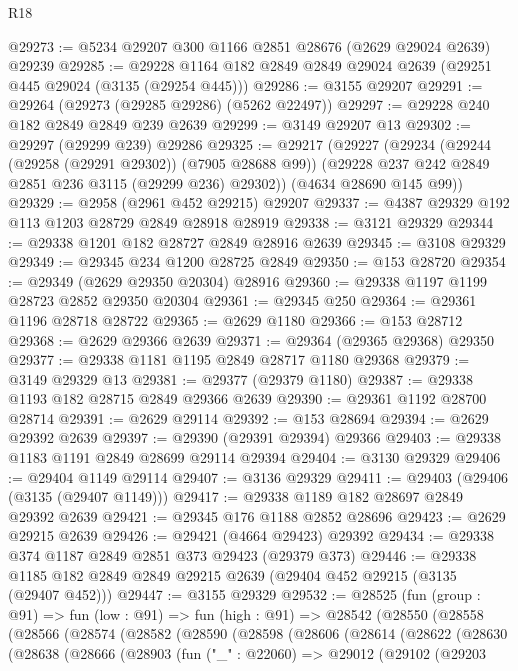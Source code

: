 \begin{lexlean}{R18}
\begin{coremodule}
@29273 := @5234 @29207 @300 @1166 @2851 @28676 (@2629 @29024 @2639) @29239
@29285 := @29228 @1164 @182 @2849 @2849 @29024 @2639 (@29251 @445 @29024 (@3135 (@29254 @445)))
@29286 := @3155 @29207
@29291 := @29264 (@29273 (@29285 @29286) (@5262 @22497))
@29297 := @29228 @240 @182 @2849 @2849 @239 @2639
@29299 := @3149 @29207 @13
@29302 := @29297 (@29299 @239) @29286
@29325 := @29217
    (@29227
      (@29234
        (@29244 (@29258 (@29291 @29302)) (@7905 @28688 @99))
        (@29228 @237 @242 @2849 @2851 @236 @3115 (@29299 @236) @29302))
      (@4634 @28690 @145 @99))
@29329 := @2958 (@2961 @452 @29215) @29207
@29337 := @4387 @29329 @192 @113 @1203 @28729 @2849 @28918 @28919
@29338 := @3121 @29329
@29344 := @29338 @1201 @182 @28727 @2849 @28916 @2639
@29345 := @3108 @29329
@29349 := @29345 @234 @1200 @28725 @2849
@29350 := @153 @28720
@29354 := @29349 (@2629 @29350 @20304) @28916
@29360 := @29338 @1197 @1199 @28723 @2852 @29350 @20304
@29361 := @29345 @250
@29364 := @29361 @1196 @28718 @28722
@29365 := @2629 @1180
@29366 := @153 @28712
@29368 := @2629 @29366 @2639
@29371 := @29364 (@29365 @29368) @29350
@29377 := @29338 @1181 @1195 @2849 @28717 @1180 @29368
@29379 := @3149 @29329 @13
@29381 := @29377 (@29379 @1180)
@29387 := @29338 @1193 @182 @28715 @2849 @29366 @2639
@29390 := @29361 @1192 @28700 @28714
@29391 := @2629 @29114
@29392 := @153 @28694
@29394 := @2629 @29392 @2639
@29397 := @29390 (@29391 @29394) @29366
@29403 := @29338 @1183 @1191 @2849 @28699 @29114 @29394
@29404 := @3130 @29329
@29406 := @29404 @1149 @29114
@29407 := @3136 @29329
@29411 := @29403 (@29406 (@3135 (@29407 @1149)))
@29417 := @29338 @1189 @182 @28697 @2849 @29392 @2639
@29421 := @29345 @176 @1188 @2852 @28696
@29423 := @2629 @29215 @2639
@29426 := @29421 (@4664 @29423) @29392
@29434 := @29338 @374 @1187 @2849 @2851 @373 @29423 (@29379 @373)
@29446 := @29338 @1185 @182 @2849 @2849 @29215 @2639 (@29404 @452 @29215 (@3135 (@29407 @452)))
@29447 := @3155 @29329
@29532 := @28525
    (fun (group : @91) =>
    fun (low : @91) =>
    fun (high : @91) =>
    @28542
      (@28550
        (@28558
          (@28566
            (@28574
              (@28582
                (@28590
                  (@28598
                    (@28606
                      (@28614
                        (@28622
                          (@28630
                            (@28638
                              (@28666
                                (@28903
                                  (fun ("_" : @22060) =>
                                  @29012
                                    (@29102
                                      (@29203

\end{coremodule}
\end{lexlean}
